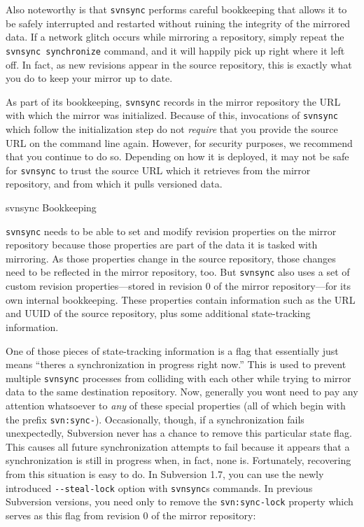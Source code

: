 Also noteworthy is that \texttt{svnsync} performs careful bookkeeping
that allows it to be safely interrupted and restarted without ruining
the integrity of the mirrored data. If a network glitch occurs while
mirroring a repository, simply repeat the \texttt{svnsync\ synchronize}
command, and it will happily pick up right where it left off. In fact,
as new revisions appear in the source repository, this is exactly what
you do to keep your mirror up to date.

As part of its bookkeeping, \texttt{svnsync} records in the mirror
repository the URL with which the mirror was initialized. Because of
this, invocations of \texttt{svnsync} which follow the initialization
step do not \emph{require} that you provide the source URL on the
command line again. However, for security purposes, we recommend that
you continue to do so. Depending on how it is deployed, it may not be
safe for \texttt{svnsync} to trust the source URL which it retrieves
from the mirror repository, and from which it pulls versioned data.

svnsync Bookkeeping

\texttt{svnsync} needs to be able to set and modify revision properties
on the mirror repository because those properties are part of the data
it is tasked with mirroring. As those properties change in the source
repository, those changes need to be reflected in the mirror repository,
too. But \texttt{svnsync} also uses a set of custom revision
properties---stored in revision 0 of the mirror repository---for its own
internal bookkeeping. These properties contain information such as the
URL and UUID of the source repository, plus some additional
state-tracking information.

One of those pieces of state-tracking information is a flag that
essentially just means ``there\textquotesingle s a synchronization in
progress right now.'' This is used to prevent multiple \texttt{svnsync}
processes from colliding with each other while trying to mirror data to
the same destination repository. Now, generally you
won\textquotesingle t need to pay any attention whatsoever to \emph{any}
of these special properties (all of which begin with the prefix
\texttt{svn:sync-}). Occasionally, though, if a synchronization fails
unexpectedly, Subversion never has a chance to remove this particular
state flag. This causes all future synchronization attempts to fail
because it appears that a synchronization is still in progress when, in
fact, none is. Fortunately, recovering from this situation is easy to
do. In Subversion 1.7, you can use the newly introduced
\texttt{-\/-steal-lock} option with \texttt{svnsync}\textquotesingle s
commands. In previous Subversion versions, you need only to remove the
\texttt{svn:sync-lock} property which serves as this flag from revision
0 of the mirror repository:

